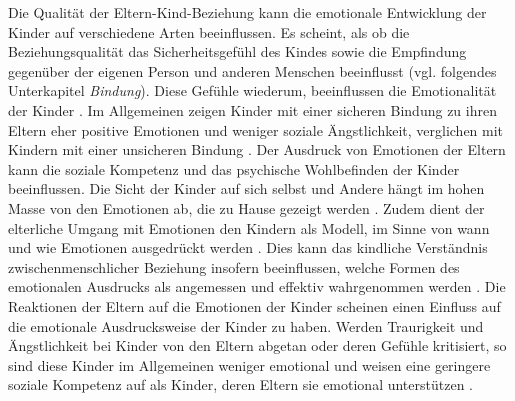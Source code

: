 Die Qualität der Eltern-Kind-Beziehung kann die emotionale Entwicklung der Kinder auf verschiedene Arten beeinflussen. Es scheint, als ob die Beziehungsqualität das Sicherheitsgefühl des Kindes sowie die Empfindung gegenüber der eigenen Person und anderen Menschen beeinflusst (vgl. folgendes Unterkapitel \textit{Bindung}). Diese Gefühle wiederum, beeinflussen die Emotionalität der Kinder \cite[S.~561]{Siegler2008}. Im Allgemeinen zeigen Kinder mit einer sicheren Bindung zu ihren Eltern eher positive Emotionen und weniger soziale Ängstlichkeit, verglichen mit Kindern mit einer unsicheren Bindung \cite{Bohlin2000}. Der Ausdruck von Emotionen der Eltern kann die soziale Kompetenz und das psychische Wohlbefinden der Kinder beeinflussen. Die Sicht der Kinder auf sich selbst und Andere hängt im hohen Masse von den Emotionen ab, die zu Hause gezeigt werden \cite{Dunsmore1997}. Zudem dient der elterliche Umgang mit Emotionen den Kindern als Modell, im Sinne von wann und wie Emotionen ausgedrückt werden \cite{Denham1994}. Dies kann das kindliche Verständnis zwischenmenschlicher Beziehung insofern beeinflussen, welche Formen des emotionalen Ausdrucks als angemessen und effektiv wahrgenommen werden \cite{Halberstadt1995}. Die Reaktionen der Eltern auf die Emotionen der Kinder scheinen einen Einfluss auf die emotionale Ausdrucksweise der Kinder zu haben. Werden Traurigkeit und Ängstlichkeit bei Kinder von den Eltern abgetan oder deren Gefühle kritisiert, so sind diese Kinder im Allgemeinen weniger emotional und weisen eine geringere soziale Kompetenz auf als Kinder, deren Eltern sie emotional unterstützen \cite{Eisenberg1998, McDowell2000}. 

